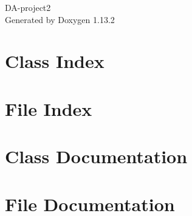 \documentclass[twoside]{book}
\newcommand{\+}{\discretionary{\mbox{\scriptsize$\hookleftarrow$}}{}{}}
\newcommand{\clearemptydoublepage}{%
    \newpage{\pagestyle{empty}\cleardoublepage}%
  }
\begin{document}
  \raggedbottom
    \hypersetup{pageanchor=false,
                bookmarksnumbered=true,
                pdfencoding=unicode
               }
  \begin{titlepage}
  \vspace*{7cm}
  \begin{center}%
  {\Large DA-\/project2}\\
  \vspace*{1cm}
  {\large Generated by Doxygen 1.13.2}\\
  \end{center}
  \end{titlepage}
  \clearemptydoublepage
  \tableofcontents
  \clearemptydoublepage
  \hypersetup{pageanchor=true}
\chapter{Class Index}

\chapter{File Index}

\chapter{Class Documentation}


\chapter{File Documentation}
















  \backmatter
  \newpage
  \clearemptydoublepage
  \printindex
\end{document}
